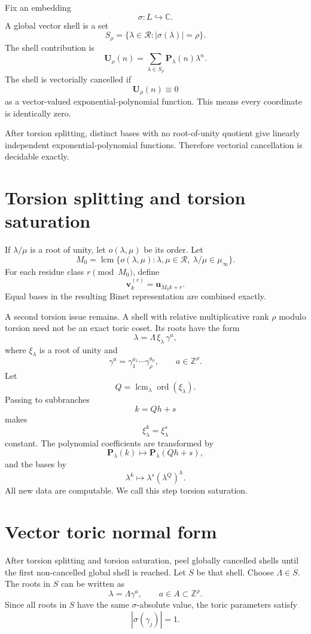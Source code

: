 \documentclass[11pt]{article}
\newcommand{\C}{\mathbb C}
\newcommand{\Z}{\mathbb Z}
\begin{document}
Fix an embedding
\[
\sigma:L\hookrightarrow\C.
\]
A global vector shell is a set
\[
S_\rho=\{\lambda\in\mathcal R:|\sigma(\lambda)|=\rho\}.
\]
The shell contribution is
\[
\mathbf U_\rho(n)=\sum_{\lambda\in S_\rho}\mathbf P_\lambda(n)\lambda^n.
\]
The shell is vectorially cancelled if
\[
\mathbf U_\rho(n)\equiv0
\]
as a vector-valued exponential-polynomial function. This means every coordinate is identically zero.

After torsion splitting, distinct bases with no root-of-unity quotient give linearly independent exponential-polynomial functions. Therefore vectorial cancellation is decidable exactly.

\section{Torsion splitting and torsion saturation}

If \(\lambda/\mu\) is a root of unity, let \(o(\lambda,\mu)\) be its order. Let
\[
M_0=\operatorname{lcm}\{o(\lambda,\mu):\lambda,\mu\in\mathcal R,\ \lambda/\mu\in\mu_\infty\}.
\]
For each residue class \(r\pmod{M_0}\), define
\[
\mathbf v^{(r)}_k=\mathbf u_{M_0k+r}.
\]
Equal bases in the resulting Binet representation are combined exactly.

A second torsion issue remains. A shell with relative multiplicative rank \(\rho\) modulo torsion need not be an exact toric coset. Its roots have the form
\[
\lambda=\Lambda\,\xi_\lambda\,\gamma^a,
\]
where \(\xi_\lambda\) is a root of unity and
\[
\gamma^a=\gamma_1^{a_1}\cdots\gamma_\rho^{a_\rho},
\qquad
a\in\Z^\rho.
\]
Let
\[
Q=\operatorname{lcm}_{\lambda}\operatorname{ord}(\xi_\lambda).
\]
Passing to subbranches
\[
k=Qh+s
\]
makes
\[
\xi_\lambda^k=\xi_\lambda^s
\]
constant. The polynomial coefficients are transformed by
\[
\mathbf P_\lambda(k)\mapsto \mathbf P_\lambda(Qh+s),
\]
and the bases by
\[
\lambda^k\mapsto \lambda^s(\lambda^Q)^h.
\]
All new data are computable. We call this step torsion saturation.

\section{Vector toric normal form}

After torsion splitting and torsion saturation, peel globally cancelled shells until the first non-cancelled global shell is reached. Let \(S\) be that shell. Choose \(\Lambda\in S\). The roots in \(S\) can be written as
\[
\lambda=\Lambda\gamma^a,
\qquad
a\in A\subset\Z^\rho.
\]
Since all roots in \(S\) have the same \(\sigma\)-absolute value, the toric parameters satisfy
\[
|\sigma(\gamma_j)|=1.
\]
\end{document}
